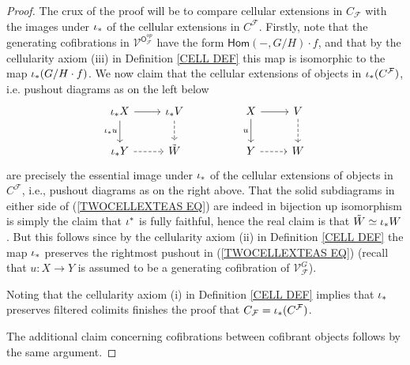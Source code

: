 \documentclass[a4paper,10pt]{article}%
\begin{document}
\begin{proof}
        The crux of the proof will be to compare 
        cellular extensions in 
        $C_{\mathcal{F}}$ with the images under $\iota_{\**}$ of the cellular extensions in 
        $C^{\mathcal{F}}$.
        Firstly, note that the generating cofibrations in 
        $\mathcal{V}^{\mathsf{O}_{\mathcal{F}}^{op}}$
        have the form $\mathsf{Hom}(\minus,G/H)\cdot f$, 
        and that by the cellularity axiom (iii) in
        Definition \ref{CELL DEF}
        this map is isomorphic to the map
        $\iota_{\**}(G/H \cdot f)$.
        We now claim that the cellular extensions of objects in 
        $\iota_{\**}(C^{\mathcal{F}})$, i.e. pushout diagrams as on the left below
        \begin{equation}\label{TWOCELLEXTEAS EQ}
                \begin{tikzcd}
                        \iota_{\**} X \ar{d}[swap]{\iota_{\**}u} \ar{r} &
                        \iota_{\**} V \ar[dashed]{d} & &
                        X \ar{d}[swap]{u} \ar{r} &
                        V \ar[dashed]{d}
                        \\
                        \iota_{\**} Y  \ar[dashed]{r}&
                        \tilde{W} & &
                        Y \ar[dashed]{r}&
                        W
                \end{tikzcd}
        \end{equation}
        are precisely the essential image under $\iota_{\**}$
        of the cellular extensions of objects in $C^{\mathcal{F}}$, 
        i.e., pushout diagrams as on the right above. That the solid subdiagrams in either side of (\ref{TWOCELLEXTEAS EQ}) are indeed in bijection up isomorphism is simply the claim that 
        $\iota^{\**}$ is fully faithful,
        hence the real claim is that $\tilde{W} \simeq \iota_{\**} W$.
        But this follows since by 
        the cellularity axiom (ii) in
        Definition \ref{CELL DEF}
        the map $\iota_{\**}$ preserves the rightmost pushout
        in (\ref{TWOCELLEXTEAS EQ}) 
        (recall that $u \colon X \to Y$ is assumed to be a generating cofibration of $\mathcal{V}^G_{\mathcal{F}}$).

        Noting that the cellularity axiom (i) in
        Definition \ref{CELL DEF} implies that
        $\iota_{\**}$ preserves filtered colimits finishes the proof that $C_{\mathcal{F}} = \iota_{\**}(C^{\mathcal{F}})$.

        The additional claim concerning cofibrations between cofibrant objects follows by the same argument.
\end{proof}
\end{document}
